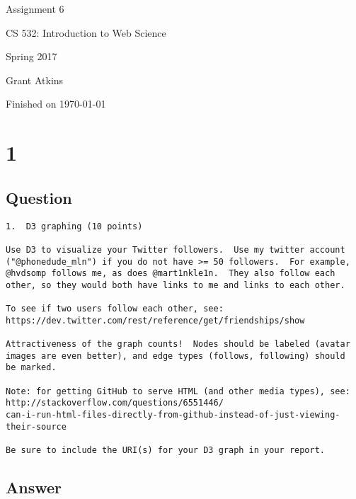 \documentclass[letterpaper,11pt]{article}
\begin{document}
\begin{titlepage}

\begin{center}

\Huge{Assignment 6}

\Large{CS 532:  Introduction to Web Science}

\Large{Spring 2017}

\Large{Grant Atkins}

\Large Finished on \today

\end{center}

\end{titlepage}

\newpage


\section*{1}

\subsection*{Question}

\begin{verbatim}
1.  D3 graphing (10 points)

Use D3 to visualize your Twitter followers.  Use my twitter account
("@phonedude_mln") if you do not have >= 50 followers.  For example,
@hvdsomp follows me, as does @mart1nkle1n.  They also follow each
other, so they would both have links to me and links to each other.

To see if two users follow each other, see:
https://dev.twitter.com/rest/reference/get/friendships/show

Attractiveness of the graph counts!  Nodes should be labeled (avatar
images are even better), and edge types (follows, following) should
be marked.

Note: for getting GitHub to serve HTML (and other media types), see:
http://stackoverflow.com/questions/6551446/
can-i-run-html-files-directly-from-github-instead-of-just-viewing-their-source

Be sure to include the URI(s) for your D3 graph in your report. 
\end{verbatim}

\clearpage
\subsection*{Answer}
\end{document}
